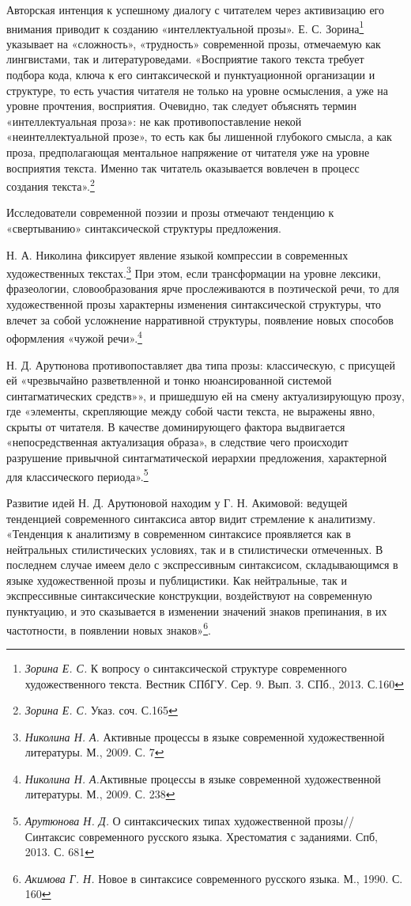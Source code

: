 \documentclass{kursa4}
\begin{document}
    Авторская интенция к успешному диалогу с читателем через активизацию его внимания приводит к созданию «интеллектуальной прозы». Е. С. Зорина\footnote{\textit{Зорина Е. С.} К вопросу о синтаксической структуре современного художественного текста. Вестник СПбГУ. Сер. 9. Вып. 3. СПб., 2013. С.160} указывает на «сложность», «трудность» современной прозы, отмечаемую как лингвистами, так и литературоведами. «Восприятие такого текста требует подбора кода, ключа к его синтаксической и пунктуационной организации и структуре, то есть участия читателя не только на уровне осмысления, а уже на уровне прочтения, восприятия. Очевидно, так следует объяснять термин «интеллектуальная проза»: не как противопоставление некой «неинтеллектуальной прозе», то есть как бы лишенной глубокого смысла, а как проза, предполагающая ментальное напряжение от читателя уже на уровне восприятия текста. Именно так читатель оказывается вовлечен в процесс создания текста».\footnote{\textit{Зорина Е. С.} Указ. соч. С.165} 

    Исследователи современной поэзии и прозы отмечают тенденцию к «свертыванию» синтаксической структуры предложения. 

    Н. А. Николина фиксирует явление языкой компрессии в современных художественных текстах.\footnote{\textit{Николина Н. А.} Активные процессы в языке современной художественной литературы. М., 2009. С. 7}  При  этом, если трансформации на уровне лексики, фразеологии, словообразования ярче прослеживаются в поэтической речи, то для художественной прозы характерны изменения синтаксической структуры, что влечет за собой усложнение нарративной структуры, появление новых способов оформления «чужой речи».\footnote{\textit{Николина Н. А.}Активные процессы в языке современной художественной литературы. М., 2009. С. 238}

    Н. Д. Арутюнова противопоставляет два типа прозы: классическую, с присущей ей «чрезвычайно разветвленной и тонко нюансированной системой синтагматических средств»», и пришедшую ей на смену актуализирующую прозу, где «элементы, скрепляющие между собой части текста, не выражены явно, скрыты от читателя. В качестве доминирующего фактора выдвигается «непосредственная актуализация образа», в следствие чего происходит разрушение привычной синтагматической иерархии предложения, характерной для классического периода».\footnote{\textit{Арутюнова Н. Д.} О синтаксических типах художественной прозы// Синтаксис современного русского языка. Хрестоматия с заданиями. Спб, 2013. С. 681} 

    Развитие идей Н. Д. Арутюновой находим у Г. Н. Акимовой: ведущей тенденцией современного синтаксиса автор видит стремление к аналитизму. «Тенденция к аналитизму в современном синтаксисе проявляется как в нейтральных стилистических условиях, так и в стилистически отмеченных. В последнем случае имеем дело с экспрессивным синтаксисом, складывающимся в языке художественной прозы и публицистики. Как нейтральные, так и экспрессивные синтаксические конструкции, воздействуют на современную пунктуацию, и это сказывается в изменении значений знаков препинания, в их частотности, в появлении новых знаков»\footnote{\textit{Акимова Г. Н.} Новое в синтаксисе современного русского языка. М., 1990. С. 160}.
\end{document}
